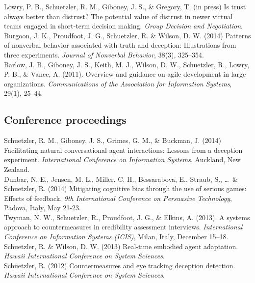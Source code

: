 \documentclass[10pt, a4paper]{article}
\newcommand{\years}[1]{\marginnote{\scriptsize #1}}
\begin{document}
Lowry, P. B., Schuetzler, R. M., Giboney, J. S., \& Gregory, T. (in
press) Is trust always better than distrust? The potential value of distrust in
newer virtual teams engaged in short-term decision making. \emph{Group Decision and Negotiation}.\\

\years{2014}Burgoon, J. K., Proudfoot, J. G., Schuetzler, R. \& Wilson,
D. W. (2014) Patterns of nonverbal behavior associated with truth and
deception: Illustrations from three experiments. \emph{Journal of Nonverbal
  Behavior}, 38(3), 325--354.\\

\years{2011}Barlow, J. B., Giboney, J. S., Keith, M. J., Wilson, D. W.,
Schuetzler, R., Lowry, P. B., \& Vance, A. (2011). Overview and guidance on
agile development in large organizations. \emph{Communications of the
  Association for Information Systems}, 29(1), 25--44.

\subsection*{Conference proceedings}
\noindent
\years{accepted}Schuetzler, R. M., Giboney, J. S., Grimes, G. M., \& Buckman,
J. (2014) Facilitating natural conversational agent interactions: Lessons from a
deception experiment. \emph{International Conference on Information Systems}. Auckland, New Zealand.\\

Dunbar, N. E., Jensen, M. L., Miller, C. H., Bessarabova, E.,
Straub, S., \ldots~\& Schuetzler, R. (2014) Mitigating cognitive bias through
the use of serious games: Effects of feedback. \emph{9th International
  Conference on
  Persuasive Technology}, Padova, Italy, May 21-23.\\

\years{2013}Twyman, N. W., Schuetzler, R., Proudfoot, J. G., \& Elkins,
A. (2013). A systems approach to countermeasures in credibility assessment
interviews. \emph{International Conference on Information Systems (ICIS)},
Milan, Italy, December 15--18.\\

Schuetzler, R. \& Wilson, D. W. (2013) Real-time embodied agent
adaptation. \emph{Hawaii International Conference on System Sciences}.\\

\years{2012}Schuetzler, R. (2012) Countermeasures and eye tracking deception
detection. \emph{Hawaii International Conference on System Sciences}.\\
\end{document}
